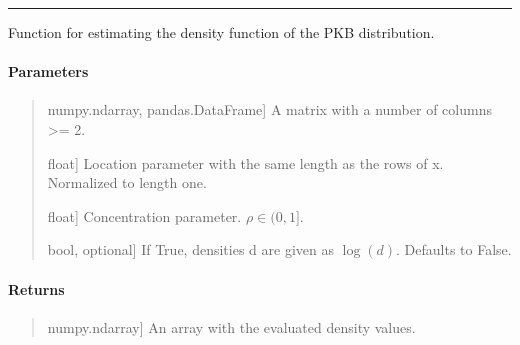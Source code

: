 \documentclass[letterpaper,10pt,english,openany,oneside]{sphinxmanual}
\begin{document}
\bigskip\hrule\bigskip


\begin{fulllineitems}
\label{\detokenize{api_reference/generated/QuadratiK.spherical_clustering.PKBD:QuadratiK.spherical_clustering.PKBD.dpkb}}
\pysigstartsignatures
{}
\pysigstopsignatures
\sphinxAtStartPar
Function for estimating the density function of the PKB distribution.


\paragraph{Parameters}
\label{\detokenize{api_reference/generated/QuadratiK.spherical_clustering.PKBD:parameters}}\begin{quote}
\begin{description}
\sphinxlineitem{x}{[}numpy.ndarray, pandas.DataFrame{]}
\sphinxAtStartPar
A matrix with a number of columns \textgreater{}= 2.

\sphinxlineitem{mu}{[}float{]}
\sphinxAtStartPar
Location parameter with the same length as the rows of x. Normalized to length one.

\sphinxlineitem{rho}{[}float{]}
\sphinxAtStartPar
Concentration parameter. \(\rho \in (0,1]\).

\sphinxlineitem{logdens}{[}bool, optional{]}
\sphinxAtStartPar
If True, densities d are given as \(\log(d)\). Defaults to False.

\end{description}
\end{quote}


\paragraph{Returns}
\label{\detokenize{api_reference/generated/QuadratiK.spherical_clustering.PKBD:returns}}\begin{quote}
\begin{description}
\sphinxlineitem{density}{[}numpy.ndarray{]}
\sphinxAtStartPar
An array with the evaluated density values.

\end{description}
\end{quote}

\end{fulllineitems}
\end{document}
